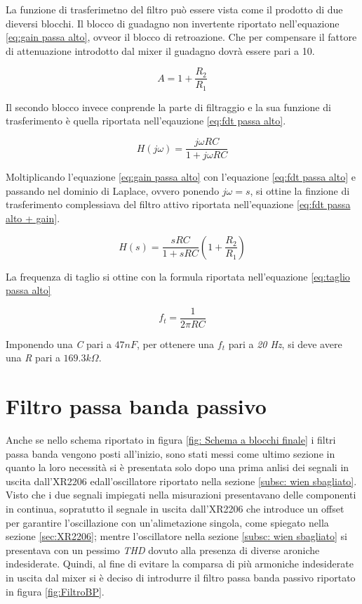 \documentclass[titlepage]{report}
\begin{document}
La funzione di trasferimetno del filtro può essere vista come il prodotto di due dieversi blocchi. Il blocco di guadagno non invertente riportato nell'equazione \ref{eq:gain passa alto}, ovveor il blocco di retroazione. Che per compensare il fattore di attenuazione introdotto dal mixer il guadagno dovrà essere pari a 10. 

\begin{equation}
	\label{eq:gain passa alto}
	A = 1 + \frac{R_2}{R_1}
\end{equation}

Il secondo blocco invece conprende la parte di filtraggio e la sua funzione di trasferimento è quella riportata nell'eqauzione \ref{eq:fdt passa alto}.

\begin{equation}
	\label{eq:fdt passa alto}
	H(j\omega) = \frac{j\omega RC}{1 + j\omega RC}
\end{equation}

Moltiplicando l'equazione \ref{eq:gain passa alto} con l'equazione \ref{eq:fdt passa alto} e passando nel dominio di Laplace, ovvero ponendo \textit{$j\omega = s$}, si ottine la finzione di trasferimento complessiava del filtro attivo riportata nell'equazione \ref{eq:fdt passa alto + gain}.

\begin{equation}
	\label{eq:fdt passa alto + gain}
	H(s) = \frac{sRC}{1 + sRC}(1 + \frac{R_2}{R_1})
\end{equation}

La frequenza di taglio si ottine con la formula riportata nell'equazione \ref{eq:taglio passa alto}

\begin{equation}
	\label{eq:taglio passa alto}
	f_t = \frac{1}{2\pi RC}
\end{equation}

Imponendo una \textit{C} pari a \textit{$47nF$}, per ottenere una $f_t$ pari a \textit{20 Hz}, si deve avere una \textit{R} pari a \textit{$169.3k\Omega$}.

\section{Filtro passa banda passivo}
\label{sc: passa banda teoria}
Anche se nello schema riportato in figura \ref{fig: Schema a blocchi finale} i filtri passa banda vengono posti all'inizio, sono stati messi come ultimo sezione in quanto la loro necessità si è presentata solo dopo una prima anlisi dei segnali in uscita dall'XR2206 edall'oscillatore riportato nella sezione \ref{subsc: wien sbagliato}. 
\noindent Visto che i due segnali impiegati nella misurazioni presentavano delle componenti in continua, sopratutto il segnale in uscita dall'XR2206 che introduce un offset per garantire l'oscillazione con un'alimetazione singola, come spiegato nella sezione \ref{sec:XR2206}; mentre l'oscillatore nella sezione \ref{subsc: wien sbagliato} si presentava con un pessimo \textit{THD} dovuto alla presenza di diverse aroniche indesiderate. Quindi, al fine di evitare la comparsa di più armoniche indesiderate in uscita dal mixer si è deciso di introdurre il filtro passa banda passivo riportato in figura \ref{fig:FiltroBP}.
\end{document}
